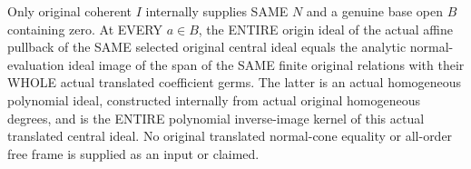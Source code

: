 \begin{theorem}
\label{hir:relative-normal-nearby-original-translated-central-polynomial-model}
\leanok
Only original coherent $I$ internally supplies SAME $N$ and a genuine base open $B$ containing zero. At EVERY $a\in B$, the ENTIRE origin ideal of the actual affine pullback of the SAME selected original central ideal equals the analytic normal-evaluation ideal image of the span of the SAME finite original relations with their WHOLE actual translated coefficient germs. The latter is an actual homogeneous polynomial ideal, constructed internally from actual original homogeneous degrees, and is the ENTIRE polynomial inverse-image kernel of this actual translated central ideal. No original translated normal-cone equality or all-order free frame is supplied as an input or claimed.
\end{theorem}
